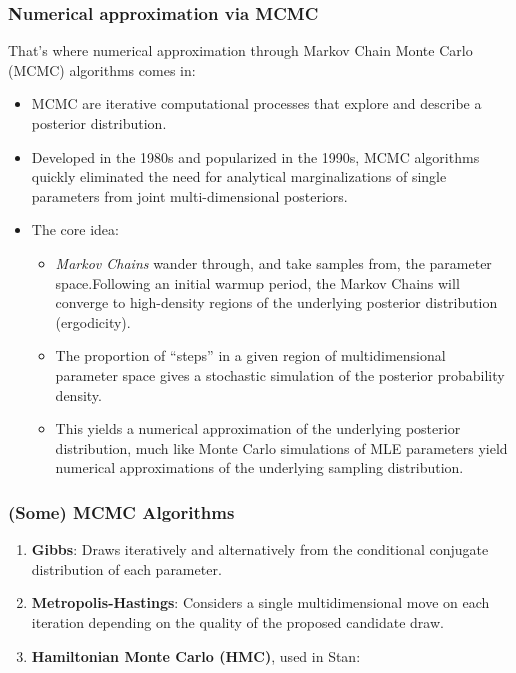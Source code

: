 \documentclass[
  11pt,
]{article}
\providecommand{\tightlist}{%
  \setlength{\itemsep}{0pt}\setlength{\parskip}{0pt}}
\begin{document}
\hypertarget{numerical-approximation-via-mcmc}{%
\subsubsection{Numerical approximation via MCMC}\label{numerical-approximation-via-mcmc}}

That's where numerical approximation through Markov Chain Monte Carlo
(MCMC) algorithms comes in:

\begin{itemize}
\tightlist
\item
  MCMC are iterative computational processes that explore and describe
  a posterior distribution.
\item
  Developed in the 1980s and popularized in the 1990s, MCMC algorithms
  quickly eliminated the need for analytical marginalizations of
  single parameters from joint multi-dimensional posteriors.
\item
  The core idea:

  \begin{itemize}
  \tightlist
  \item
    \emph{Markov Chains} wander through, and take samples from, the
    parameter space.Following an initial warmup period, the Markov
    Chains will converge to high-density regions of the underlying
    posterior distribution (ergodicity).
  \item
    The proportion of ``steps'' in a given region of multidimensional
    parameter space gives a stochastic simulation of the posterior
    probability density.
  \item
    This yields a numerical approximation of the underlying
    posterior distribution, much like Monte Carlo simulations of MLE
    parameters yield numerical approximations of the underlying
    sampling distribution.
  \end{itemize}
\end{itemize}

\hypertarget{some-mcmc-algorithms}{%
\subsubsection{(Some) MCMC Algorithms}\label{some-mcmc-algorithms}}

\begin{enumerate}
\def\labelenumi{\arabic{enumi}.}
\tightlist
\item
  \textbf{Gibbs}: Draws iteratively and alternatively from the conditional
  conjugate distribution of each parameter.
\item
  \textbf{Metropolis-Hastings}: Considers a single multidimensional move on
  each iteration depending on the quality of the proposed candidate
  draw.
\item
  \textbf{Hamiltonian Monte Carlo (HMC)}, used in Stan:
\end{enumerate}
\end{document}

